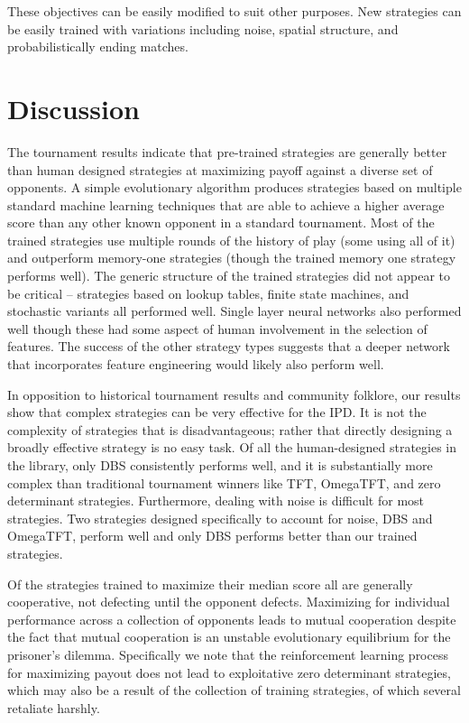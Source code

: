 \documentclass{article}
\begin{document}
These objectives can be easily modified to suit other purposes. New strategies
can be easily trained with variations including noise, spatial structure, and
probabilistically ending matches.

\section{Discussion}

The tournament results indicate that pre-trained strategies are generally better
than human designed strategies at maximizing payoff against a diverse set of
opponents. A simple evolutionary algorithm produces strategies based on multiple
standard machine learning techniques that are able to achieve a higher average
score than any other known opponent in a standard tournament. Most of the trained
strategies use multiple rounds of the history of play (some using all of it) and
outperform memory-one strategies (though the trained memory one strategy performs
well). The generic structure of the trained strategies did not appear to be
critical -- strategies based on lookup tables, finite state machines, and stochastic
variants all performed well. Single layer neural networks also performed well
though these had some aspect of human involvement in the selection of features.
The success of the other strategy types suggests that a deeper network that
incorporates feature engineering would likely also perform well.

In opposition to historical tournament results and community folklore,
our results show that complex strategies can be very effective for the
IPD. It is not the complexity of strategies that is disadvantageous; rather that directly
designing a broadly effective strategy is no easy task. Of all the human-designed
strategies in the library, only DBS consistently performs well, and it is
substantially more complex than traditional tournament winners like TFT, OmegaTFT,
and zero determinant strategies. Furthermore, dealing with noise is difficult
for most strategies. Two strategies designed specifically to account for noise,
DBS and OmegaTFT, perform well and only DBS performs better than our trained
strategies.

Of the strategies trained to maximize their median score all are generally
cooperative, not defecting until the opponent defects. Maximizing for individual
performance across a collection of opponents leads to mutual cooperation despite
the fact that mutual cooperation is an unstable evolutionary equilibrium for the prisoner's
dilemma. Specifically we note that the reinforcement learning process for maximizing
payout does not lead to exploitative zero determinant strategies, which may also
be a result of the collection of training strategies, of which several retaliate harshly.
\end{document}
